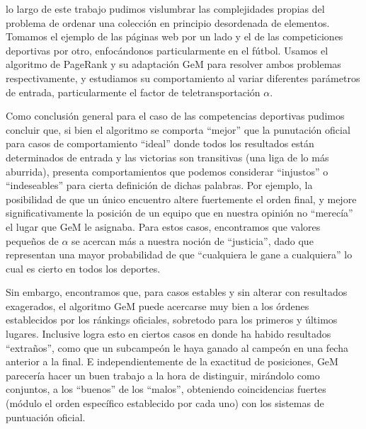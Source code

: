  lo largo de este trabajo pudimos vislumbrar las complejidades propias del problema de ordenar una colección en principio desordenada de elementos. Tomamos el ejemplo de las páginas web por un lado y el de las competiciones deportivas por otro, enfocándonos particularmente en el fútbol. Usamos el algoritmo de PageRank y su adaptación GeM para resolver ambos problemas respectivamente, y estudiamos su comportamiento al variar diferentes parámetros de entrada, particularmente el factor de teletransportación $\alpha$.

Como conclusión general para el caso de las competencias deportivas pudimos concluir que, si bien el algoritmo se comporta ``mejor'' que la punutación oficial para casos de comportamiento ``ideal'' donde todos los resultados están determinados de entrada y las victorias son transitivas (una liga de lo más aburrida), presenta comportamientos que podemos considerar ``injustos'' o ``indeseables'' para cierta definición de dichas palabras. Por ejemplo, la posibilidad de que un único encuentro altere fuertemente el orden final, y mejore significativamente la posición de un equipo que en nuestra opinión no ``merecía'' el lugar que GeM le asignaba. Para estos casos, encontramos que valores pequeños de $\alpha$ se acercan más a nuestra noción de ``justicia'', dado que representan una mayor probabilidad de que ``cualquiera le gane a cualquiera'' lo cual es cierto en todos los deportes.

Sin embargo, encontramos que, para casos estables y sin alterar con resultados exagerados, el algoritmo GeM puede acercarse muy bien a los órdenes establecidos por los ránkings oficiales, sobretodo para los primeros y últimos lugares. Inclusive logra esto en ciertos casos en donde ha habido resultados ``extraños'', como que un subcampeón le haya ganado al campeón en una fecha anterior a la final. E independientemente de la exactitud de posiciones, GeM parecería hacer un buen trabajo a la hora de distinguir, mirándolo como conjuntos, a los ``buenos'' de los ``malos'', obteniendo coincidencias fuertes (módulo el orden específico establecido por cada uno) con los sistemas de puntuación oficial.